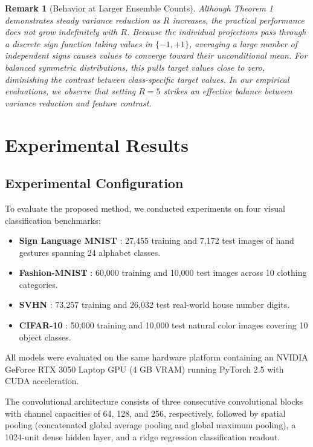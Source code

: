 \documentclass[journal]{IEEEtran}
\newtheorem{remark}{Remark}
\begin{document}
\begin{remark}[Behavior at Larger Ensemble Counts]
Although Theorem 1 demonstrates steady variance reduction as $R$ increases, the practical performance does not grow indefinitely with $R$. Because the individual projections pass through a discrete sign function taking values in $\{-1, +1\}$, averaging a large number of independent signs causes values to converge toward their unconditional mean. For balanced symmetric distributions, this pulls target values close to zero, diminishing the contrast between class-specific target values. In our empirical evaluations, we observe that setting $R=5$ strikes an effective balance between variance reduction and feature contrast.
\end{remark}

\section{Experimental Results}

\subsection{Experimental Configuration}
To evaluate the proposed method, we conducted experiments on four visual classification benchmarks:
\begin{itemize}
    \item \textbf{Sign Language MNIST} \cite{kaggle_sign_mnist}: 27,455 training and 7,172 test images of hand gestures spanning 24 alphabet classes.
    \item \textbf{Fashion-MNIST} \cite{xiao2017fashion}: 60,000 training and 10,000 test images across 10 clothing categories.
    \item \textbf{SVHN} \cite{netzer2011reading}: 73,257 training and 26,032 test real-world house number digits.
    \item \textbf{CIFAR-10} \cite{krizhevsky2009learning}: 50,000 training and 10,000 test natural color images covering 10 object classes.
\end{itemize}

All models were evaluated on the same hardware platform containing an NVIDIA GeForce RTX 3050 Laptop GPU (4 GB VRAM) running PyTorch 2.5 with CUDA acceleration. 

The convolutional architecture consists of three consecutive convolutional blocks with channel capacities of 64, 128, and 256, respectively, followed by spatial pooling (concatenated global average pooling and global maximum pooling), a 1024-unit dense hidden layer, and a ridge regression classification readout. 
\end{document}
